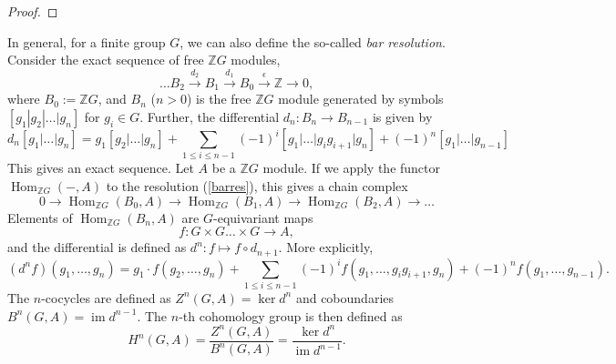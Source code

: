 \documentclass[11pt]{book}
\theoremstyle{Rem}
\theoremstyle{definition}
\numberwithin{equation}{section}
\newcommand\Img{\operatorname{im}}
\newcommand\Hom{\operatorname{Hom}}
\newcommand\ZZ{\mathbb Z}
\newcommand{\ra}\rightarrow
\newcommand{\xra}\xrightarrow
\begin{document}
\begin{appendix}
\begin{proof}
\end{proof}
In general, for a finite group $G$, we can also define the so-called \textit{bar resolution}. Consider the exact sequence of free $\ZZ G$ modules, \begin{equation}
	\dots B_2 \xra{d_2} B_1\xra{d_1} B_0\xra{\epsilon}\ZZ \ra 0,\label{barres}
\end{equation} where $B_0 := \ZZ G$, and $B_n$ ($n>0$) is the free $\ZZ G$ module generated by symbols $[g_1| g_2 | \dots | g_n]$ for $g_i \in G$. Further, the differential $d_n:B_n\ra B_{n-1}$ is given by \begin{equation}\nonumber
	d_n[g_1|\dots | g_n] = g_1[g_2|\dots|g_n]+\sum_{1\leq i\leq n-1} (-1)^i[g_1|\dots|g_ig_{i+1}|g_n] + (-1)^n[g_1|\dots|g_{n-1}]
\end{equation}
This gives an exact sequence. Let $A$ be a $\ZZ G$ module. If we apply the functor $\Hom_{\ZZ G} (-, A)$ to the resolution (\ref{barres}), this gives a chain complex  
\begin{equation}
	0\ra\Hom_{\ZZ G}(B_0, A)\ra\Hom_{\ZZ G} (B_1, A)\ra \Hom_{\ZZ G}(B_2, A)\ra\dots
\end{equation}
Elements of $\Hom_{\ZZ G} (B_n, A)$ are $G$-equivariant maps \begin{equation}
	f:G\times G \dots \times G \ra A,
\end{equation} and the differential is defined as $d^n: f\mapsto f\circ d_{n+1}$. More explicitly,
	\begin{equation}\nonumber
	(d^nf)(g_1,\dots , g_n) = g_1\cdot f(g_2,\dots,g_n)+\sum_{1\leq i\leq n-1} (-1)^if(g_1,\dots,g_ig_{i+1},g_n)  + (-1)^nf(g_1,\dots,g_{n-1}).
\end{equation}
The $n$-cocycles are defined as $Z^n(G, A) = \ker d^n$ and coboundaries $B^n(G, A) =\Img d^{n-1}$. The $n$-th cohomology group is then defined as \begin{equation}
	H^n(G, A) = \frac{Z^n(G, A)}{B^n(G, A)} = \frac{\ker d^n}{\Img d^{n-1}}.
\end{equation}
\end{appendix}


\end{document}
